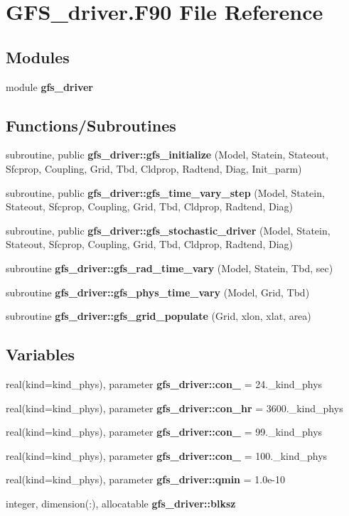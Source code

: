 \section{G\+F\+S\+\_\+driver.\+F90 File Reference}
\label{_g_f_s__driver_8_f90}
\subsection*{Modules}
\begin{DoxyCompactItemize}
\item 
module \textbf{ gfs\+\_\+driver}
\end{DoxyCompactItemize}
\subsection*{Functions/\+Subroutines}
\begin{DoxyCompactItemize}
\item 
subroutine, public \textbf{ gfs\+\_\+driver\+::gfs\+\_\+initialize} (Model, Statein, Stateout, Sfcprop, Coupling, Grid, Tbd, Cldprop, Radtend, Diag, Init\+\_\+parm)
\item 
subroutine, public \textbf{ gfs\+\_\+driver\+::gfs\+\_\+time\+\_\+vary\+\_\+step} (Model, Statein, Stateout, Sfcprop, Coupling, Grid, Tbd, Cldprop, Radtend, Diag)
\item 
subroutine, public \textbf{ gfs\+\_\+driver\+::gfs\+\_\+stochastic\+\_\+driver} (Model, Statein, Stateout, Sfcprop, Coupling, Grid, Tbd, Cldprop, Radtend, Diag)
\item 
subroutine \textbf{ gfs\+\_\+driver\+::gfs\+\_\+rad\+\_\+time\+\_\+vary} (Model, Statein, Tbd, sec)
\item 
subroutine \textbf{ gfs\+\_\+driver\+::gfs\+\_\+phys\+\_\+time\+\_\+vary} (Model, Grid, Tbd)
\item 
subroutine \textbf{ gfs\+\_\+driver\+::gfs\+\_\+grid\+\_\+populate} (Grid, xlon, xlat, area)
\end{DoxyCompactItemize}
\subsection*{Variables}
\begin{DoxyCompactItemize}
\item 
real(kind=kind\+\_\+phys), parameter \textbf{ gfs\+\_\+driver\+::con\+\_} = 24.\+\_\+kind\+\_\+phys
\item 
real(kind=kind\+\_\+phys), parameter \textbf{ gfs\+\_\+driver\+::con\+\_\+hr} = 3600.\+\_\+kind\+\_\+phys
\item 
real(kind=kind\+\_\+phys), parameter \textbf{ gfs\+\_\+driver\+::con\+\_} = 99.\+\_\+kind\+\_\+phys
\item 
real(kind=kind\+\_\+phys), parameter \textbf{ gfs\+\_\+driver\+::con\+\_} = 100.\+\_\+kind\+\_\+phys
\item 
real(kind=kind\+\_\+phys), parameter \textbf{ gfs\+\_\+driver\+::qmin} = 1.\+0e-\/10
\item 
integer, dimension(\+:), allocatable \textbf{ gfs\+\_\+driver\+::blksz}
\end{DoxyCompactItemize}
